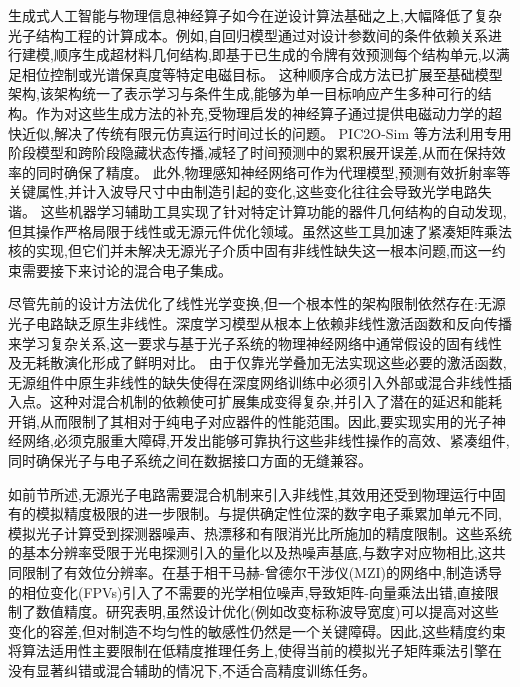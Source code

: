 \documentclass[11pt]{article}
\begin{document}
生成式人工智能与物理信息神经算子如今在逆设计算法基础之上,大幅降低了复杂光子结构工程的计算成本。例如,自回归模型通过对设计参数间的条件依赖关系进行建模,顺序生成超材料几何结构,即基于已生成的令牌有效预测每个结构单元,以满足相位控制或光谱保真度等特定电磁目标。\citep{doi_10_48550_arxiv_2507_06853_b7161f49} 这种顺序合成方法已扩展至基础模型架构,该架构统一了表示学习与条件生成,能够为单一目标响应产生多种可行的结构。作为对这些生成方法的补充,受物理启发的神经算子通过提供电磁动力学的超快近似,解决了传统有限元仿真运行时间过长的问题。\citep{doi_10_1016_j_compositesb_2025_112935_31ebab19} PIC2O-Sim 等方法利用专用阶段模型和跨阶段隐藏状态传播,减轻了时间预测中的累积展开误差,从而在保持效率的同时确保了精度。\citep{doi_10_48550_arxiv_2406_17810_813bd2a3} 此外,物理感知神经网络可作为代理模型,预测有效折射率等关键属性,并计入波导尺寸中由制造引起的变化,这些变化往往会导致光学电路失谐。\citep{doi_10_1007_s11082_024_08009_8_0f7f241e} 这些机器学习辅助工具实现了针对特定计算功能的器件几何结构的自动发现,但其操作严格局限于线性或无源元件优化领域。虽然这些工具加速了紧凑矩阵乘法核的实现,但它们并未解决无源光子介质中固有非线性缺失这一根本问题,而这一约束需要接下来讨论的混合电子集成。\citep{doi_10_1109_access_2026_3697666_bd5258a6} \citep{doi_10_48550_arxiv_2406_17810_813bd2a3} \citep{doi_10_1007_s11082_024_08009_8_0f7f241e} \citep{doi_10_1063_5_0159264_6f483b1f}

尽管先前的设计方法优化了线性光学变换,但一个根本性的架构限制依然存在:无源光子电路缺乏原生非线性。深度学习模型从根本上依赖非线性激活函数和反向传播来学习复杂关系,这一要求与基于光子系统的物理神经网络中通常假设的固有线性及无耗散演化形成了鲜明对比。\citep{doi_10_1002_adma_202522820_5596700a} 由于仅靠光学叠加无法实现这些必要的激活函数,无源组件中原生非线性的缺失使得在深度网络训练中必须引入外部或混合非线性插入点。这种对混合机制的依赖使可扩展集成变得复杂,并引入了潜在的延迟和能耗开销,从而限制了其相对于纯电子对应器件的性能范围。因此,要实现实用的光子神经网络,必须克服重大障碍,开发出能够可靠执行这些非线性操作的高效、紧凑组件,同时确保光子与电子系统之间在数据接口方面的无缝兼容。\citep{doi_10_1038_s41586_021_04223_6_6158a5ea} \citep{doi_10_1515_nanoph_2019_0474_d2187501} \citep{doi_10_3390_nano14080697_c372a140}

如前节所述,无源光子电路需要混合机制来引入非线性,其效用还受到物理运行中固有的模拟精度极限的进一步限制。与提供确定性位深的数字电子乘累加单元不同,模拟光子计算受到探测器噪声、热漂移和有限消光比所施加的精度限制。这些系统的基本分辨率受限于光电探测引入的量化以及热噪声基底,与数字对应物相比,这共同限制了有效位分辨率。在基于相干马赫-曾德尔干涉仪(MZI)的网络中,制造诱导的相位变化(FPVs)引入了不需要的光学相位噪声,导致矩阵-向量乘法出错,直接限制了数值精度。研究表明,虽然设计优化(例如改变标称波导宽度)可以提高对这些变化的容差,但对制造不均匀性的敏感性仍然是一个关键障碍。因此,这些精度约束将算法适用性主要限制在低精度推理任务上,使得当前的模拟光子矩阵乘法引擎在没有显著纠错或混合辅助的情况下,不适合高精度训练任务。\citep{doi_10_3390_nano14080697_c372a140} \citep{doi_10_3390_nano14080697_c372a140} \citep{doi_10_1109_tnano_2022_3223915_d4da3e6b} \citep{doi_10_1515_nanoph_2022_0423_38a2c3ec}
\end{document}
